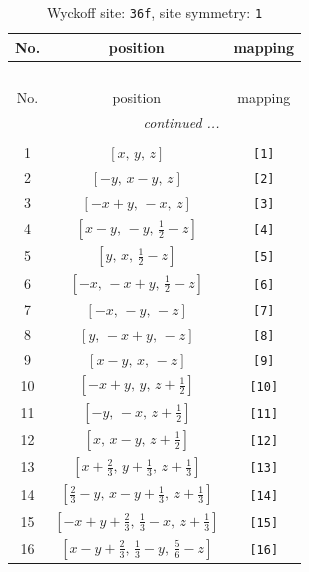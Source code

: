 \documentclass[fleqn,8pt]{jsarticle}
\begin{document}
\renewcommand{\arraystretch}{1.2}
\begin{longtable}{ccc}
\caption{Wyckoff site: {\tt 36f}, site symmetry: {\tt 1}}
 \\
 \hline \hline
No. & position & mapping \\ \hline \endfirsthead

\multicolumn{2}{l}{\tablename\ \thetable{}} \\
 \hline \hline
No. & position & mapping \\ \hline \endhead

 \hline \hline
\multicolumn{2}{r}{\footnotesize\it continued ...} \\ \endfoot

 \hline \hline
\multicolumn{2}{r}{} \\ \endlastfoot

1 & $\left[ x,\, y,\, z \right]$ & {\tt [1]} \\ \hline
2 & $\left[ - y,\, x - y,\, z \right]$ & {\tt [2]} \\ \hline
3 & $\left[ - x + y,\, - x,\, z \right]$ & {\tt [3]} \\ \hline
4 & $\left[ x - y,\, - y,\, \frac{1}{2} - z \right]$ & {\tt [4]} \\ \hline
5 & $\left[ y,\, x,\, \frac{1}{2} - z \right]$ & {\tt [5]} \\ \hline
6 & $\left[ - x,\, - x + y,\, \frac{1}{2} - z \right]$ & {\tt [6]} \\ \hline
7 & $\left[ - x,\, - y,\, - z \right]$ & {\tt [7]} \\ \hline
8 & $\left[ y,\, - x + y,\, - z \right]$ & {\tt [8]} \\ \hline
9 & $\left[ x - y,\, x,\, - z \right]$ & {\tt [9]} \\ \hline
10 & $\left[ - x + y,\, y,\, z + \frac{1}{2} \right]$ & {\tt [10]} \\ \hline
11 & $\left[ - y,\, - x,\, z + \frac{1}{2} \right]$ & {\tt [11]} \\ \hline
12 & $\left[ x,\, x - y,\, z + \frac{1}{2} \right]$ & {\tt [12]} \\ \hline
13 & $\left[ x + \frac{2}{3},\, y + \frac{1}{3},\, z + \frac{1}{3} \right]$ & {\tt [13]} \\ \hline
14 & $\left[ \frac{2}{3} - y,\, x - y + \frac{1}{3},\, z + \frac{1}{3} \right]$ & {\tt [14]} \\ \hline
15 & $\left[ - x + y + \frac{2}{3},\, \frac{1}{3} - x,\, z + \frac{1}{3} \right]$ & {\tt [15]} \\ \hline
16 & $\left[ x - y + \frac{2}{3},\, \frac{1}{3} - y,\, \frac{5}{6} - z \right]$ & {\tt [16]} \\ \hline

\end{longtable}
\end{document}
